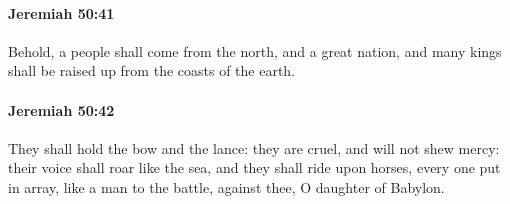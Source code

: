 		\paragraph{Jeremiah 50:41} %
			\label{JEREMIAH-50-41}

			Behold, a people shall come from the north, and a great nation, and many kings shall be raised up from the coasts of the earth.


		\paragraph{Jeremiah 50:42} %
			\label{JEREMIAH-50-42}

			They shall hold the bow and the lance: they are cruel, and will not shew mercy: their voice shall roar like the sea, and they shall ride upon horses, every one put in array, like a man to the battle, against thee, O daughter of Babylon.

